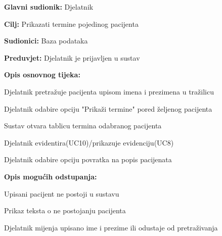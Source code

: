 				\noindent {}
				\begin{packed_item}
					
					\item \textbf{Glavni sudionik: }Djelatnik
					\item  \textbf{Cilj: }Prikazati termine pojedinog pacijenta 
					\item  \textbf{Sudionici: }Baza podataka
					\item  \textbf{Preduvjet: }Djelatnik je prijavljen u sustav
				
					\item  \textbf{Opis osnovnog tijeka: }
					
					\item[] \begin{packed_enum}
						
						\item Djelatnik pretražuje pacijenta upisom imena i prezimena u tražilicu
						\item Djelatnik odabire opciju "Prikaži termine" pored željenog pacijenta
						\item Sustav otvara tablicu termina odabranog pacijenta
						\item Djelatnik evidentira(UC10)/prikazuje evidenciju(UC8)
						\item Djelatnik odabire opciju povratka na popis pacijenata
					\end{packed_enum}
					
					\item  \textbf{Opis mogućih odstupanja:}
					
					\item[] \begin{packed_item}
						
						\item[1.a] Upisani pacijent ne postoji u sustavu
						\item[] \begin{packed_enum}
							\item Prikaz teksta o ne postojanju pacijenta
							\item Djelatnik mijenja upisano ime i prezime ili odustaje od pretraživanja
							
						\end{packed_enum}
						
					\end{packed_item}
					\item[] \begin{packed_item}
						

\end{packed_item}
\end{packed_item}
